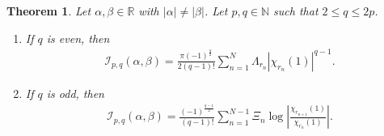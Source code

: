 \documentclass[12pt, reqno]{amsart}
\theoremstyle{plain}
\newtheorem{theorem}{Theorem}[section]
\theoremstyle{definition}
\begin{document}
\begin{theorem}\label{mainthmcompute}
    Let $\alpha, \beta\in\mathbb{R}$ with $|\alpha|\ne|\beta|$. Let $p, q\in\mathbb{N}$ such that $2\le q\le 2p$.  
    \begin{enumerate}
        \item[(a)] If $q$ is even, then
        \begin{align*}
            \mathcal{I}_{p, q}(\alpha, \beta)=\frac{\pi(-1)^{\frac{q}{2}}}{2(q-1)!}\sum_{n=1}^N\Lambda_{r_n}|\chi_{r_n}(1)|^{q-1}.
        \end{align*}
        \item[(b)] If $q$ is odd, then
        \begin{align*}
            \mathcal{I}_{p, q}(\alpha, \beta)=\frac{(-1)^{\frac{q-1}{2}}}{(q-1)!}\sum_{n=1}^{N-1}\Xi_n\log\left|\frac{\chi_{r_{n+1}}(1)}{\chi_{r_{n}}(1)}\right|.
        \end{align*}
    \end{enumerate}
\end{theorem}
\end{document}
